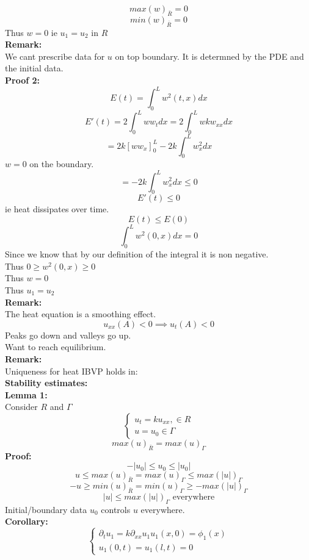 \documentclass{article}
\begin{document}
$$ max(w)_{\bar{R}} = 0$$
$$ min(w)_{\bar{R}} = 0$$
Thus $w = 0$ ie $u_1 = u_2 $ in $R$ \\
\textbf{Remark:} \\
We cant prescribe data for $u$ on top boundary. It is determned by the PDE and the initial data.\\
\textbf{Proof 2:} \\
$$E(t) = \int_0^L w^2(t,x) dx$$
$$E'(t) = 2 \int_0^L w w_t dx = 2 \int_0^L w k w_{xx} dx $$
$$ = 2k \left[ w w_x \right]_0^L - 2k \int_0^L w_x^2 dx$$
$w = 0$ on the boundary.\\
$$ = -2k \int_0^L w_x^2 dx \leq 0$$
$$ E'(t) \leq 0$$
ie heat dissipates over time.\\
$$E(t) \leq E(0)$$
$$\int_0^L w^2(0,x) dx = 0$$
Since we know that by our definition of the integral it is non negative.\\
Thus $0 \geq w^2(0,x) \geq 0$\\
Thus $w = 0$\\
Thus $u_1 = u_2$\\
\textbf{Remark:} \\
The heat equation is a smoothing effect.\\
$$u_{xx}(A) < 0 \implies u_{t}(A) < 0$$
Peaks go down and valleys go up.\\
Want to reach equilibrium.\\
\textbf{Remark:} \\
Uniqueness for heat IBVP holds in: \\
\textbf{Stability estimates:} \\
\textbf{Lemma 1:} \\
Consider $R$ and $\Gamma$
$$\begin{cases}
    u_t = ku_{xx}, \in R\\
    u = u_0 \in \Gamma
\end{cases}
$$
$$max(u)_{\bar{R}} = max(u)_{\Gamma}$$
\textbf{Proof:} \\
$$-|u_0| \leq u_0 \leq |u_0|$$
$$ u \leq max(u)_{\bar{R}} = max(u)_{\Gamma} \leq max(|u|)_\Gamma$$
$$ -u \geq min(u)_{\bar{R}} = min(u)_{\Gamma} \geq -max(|u|)_\Gamma$$
$$ |u| \leq max(|u|)_\Gamma \text{ everywhere}$$
Initial/boundary data $u_0$ controls $u$ everywhere.\\
\textbf{Corollary:} \\
$$\begin{cases}
    \partial_t u_1 = k \partial_{xx} u_1
    u_1(x,0) = \phi_1(x)\\
    u_1(0,t) = u_1(l,t) =  0
\end{cases}$$
\end{document}
